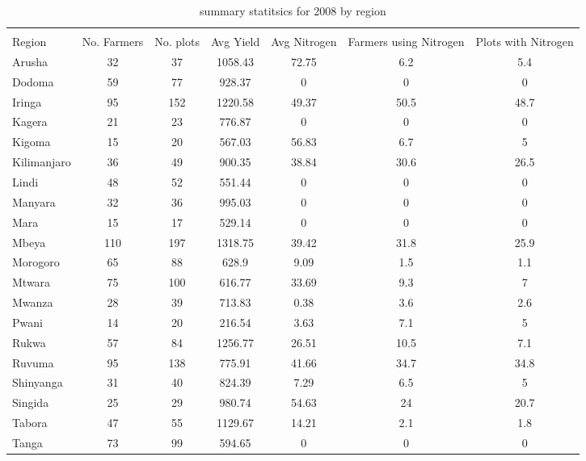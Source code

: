\documentclass{article}
\begin{document}
\begin{table}
	\caption{summary statitsics for 2008 by region}
	\label{}
\begin{tabular}{@{\extracolsep{5pt}}lcccccc}
\\[-1.8ex]\hline 
\hline \\[-1.8ex]
Region & \multicolumn{1}{c}{No. Farmers} & \multicolumn{1}{c}{No. plots} & \multicolumn{1}{c}{Avg Yield} & \multicolumn{1}{c}{Avg Nitrogen} & \multicolumn{1}{c}{Farmers using Nitrogen} &\multicolumn{1}{c}{Plots with Nitrogen} \\
\hline
Arusha & 32 & 37 & 1058.43 & 72.75 & 6.2 & 5.4 \\
Dodoma & 59 & 77 & 928.37 & 0 & 0 & 0 \\
Iringa & 95 & 152 & 1220.58 & 49.37 & 50.5 & 48.7 \\
Kagera & 21 & 23 & 776.87 & 0 & 0 & 0 \\
Kigoma & 15 & 20 & 567.03 & 56.83 & 6.7 & 5 \\
Kilimanjaro & 36 & 49 & 900.35 & 38.84 & 30.6 & 26.5 \\
Lindi & 48 & 52 & 551.44 & 0 & 0 & 0 \\
Manyara & 32 & 36 & 995.03 & 0 & 0 & 0 \\
Mara & 15 & 17 & 529.14 & 0 & 0 & 0 \\
Mbeya & 110 & 197 & 1318.75 & 39.42 & 31.8 & 25.9 \\
Morogoro & 65 & 88 & 628.9 & 9.09 & 1.5 & 1.1 \\
Mtwara & 75 & 100 & 616.77 & 33.69 & 9.3 & 7 \\
Mwanza & 28 & 39 & 713.83 & 0.38 & 3.6 & 2.6 \\
Pwani & 14 & 20 & 216.54 & 3.63 & 7.1 & 5 \\
Rukwa & 57 & 84 & 1256.77 & 26.51 & 10.5 & 7.1 \\
Ruvuma & 95 & 138 & 775.91 & 41.66 & 34.7 & 34.8 \\
Shinyanga & 31 & 40 & 824.39 & 7.29 & 6.5 & 5 \\
Singida & 25 & 29 & 980.74 & 54.63 & 24 & 20.7 \\
Tabora & 47 & 55 & 1129.67 & 14.21 & 2.1 & 1.8 \\
Tanga & 73 & 99 & 594.65 & 0 & 0 & 0 \\
\hline
\end{tabular}
\end{table}
\end{document}
